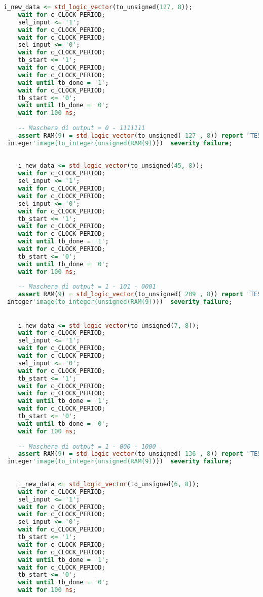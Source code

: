 \documentclass [a4paper, 12pt]{article}
\begin{document}
\begin{lstlisting}[language=VHDL, caption=tb\_pfrl\_2020\_repeated.vhd, basicstyle=\tiny, breaklines]
    i_new_data <= std_logic_vector(to_unsigned(127, 8));
    wait for c_CLOCK_PERIOD;
    sel_input <= '1';
    wait for c_CLOCK_PERIOD;
    wait for c_CLOCK_PERIOD;
    sel_input <= '0';
    wait for c_CLOCK_PERIOD;
    tb_start <= '1';
    wait for c_CLOCK_PERIOD;
    wait for c_CLOCK_PERIOD;
    wait until tb_done = '1';
    wait for c_CLOCK_PERIOD;
    tb_start <= '0';
    wait until tb_done = '0';
    wait for 100 ns;
    
    -- Maschera di output = 0 - 1111111
    assert RAM(9) = std_logic_vector(to_unsigned( 127 , 8)) report "TEST FALLITO. Expected  209  found " &
 integer'image(to_integer(unsigned(RAM(9))))  severity failure;
   
    
    i_new_data <= std_logic_vector(to_unsigned(45, 8));
    wait for c_CLOCK_PERIOD;
    sel_input <= '1';
    wait for c_CLOCK_PERIOD;
    wait for c_CLOCK_PERIOD;
    sel_input <= '0';
    wait for c_CLOCK_PERIOD;
    tb_start <= '1';
    wait for c_CLOCK_PERIOD;
    wait for c_CLOCK_PERIOD;
    wait until tb_done = '1';
    wait for c_CLOCK_PERIOD;
    tb_start <= '0';
    wait until tb_done = '0';
    wait for 100 ns;
    
    -- Maschera di output = 1 - 101 - 0001
    assert RAM(9) = std_logic_vector(to_unsigned( 209 , 8)) report "TEST FALLITO. Expected  209  found " &
 integer'image(to_integer(unsigned(RAM(9))))  severity failure;
    

    i_new_data <= std_logic_vector(to_unsigned(7, 8));
    wait for c_CLOCK_PERIOD;
    sel_input <= '1';
    wait for c_CLOCK_PERIOD;
    wait for c_CLOCK_PERIOD;
    sel_input <= '0';
    wait for c_CLOCK_PERIOD;
    tb_start <= '1';
    wait for c_CLOCK_PERIOD;
    wait for c_CLOCK_PERIOD;
    wait until tb_done = '1';
    wait for c_CLOCK_PERIOD;
    tb_start <= '0';
    wait until tb_done = '0';
    wait for 100 ns;
    
    -- Maschera di output = 1 - 000 - 1000
    assert RAM(9) = std_logic_vector(to_unsigned( 136 , 8)) report "TEST FALLITO. Expected  136  found " &
 integer'image(to_integer(unsigned(RAM(9))))  severity failure;
    
    
    i_new_data <= std_logic_vector(to_unsigned(6, 8));
    wait for c_CLOCK_PERIOD;
    sel_input <= '1';
    wait for c_CLOCK_PERIOD;
    wait for c_CLOCK_PERIOD;
    sel_input <= '0';
    wait for c_CLOCK_PERIOD;
    tb_start <= '1';
    wait for c_CLOCK_PERIOD;
    wait for c_CLOCK_PERIOD;
    wait until tb_done = '1';
    wait for c_CLOCK_PERIOD;
    tb_start <= '0';
    wait until tb_done = '0';
    wait for 100 ns;
    

\end{lstlisting}
\end{document}
